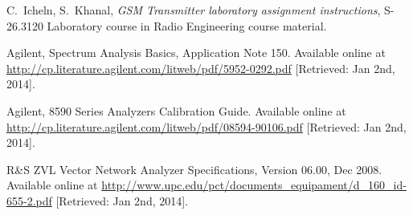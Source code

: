 \documentclass[a4paper, 12pt]{article}
\begin{document}
\newpage
\begin{thebibliography}{9}%

 C.\ Icheln, S.\ Khanal, 
	\textit{GSM Transmitter laboratory assignment instructions},
	S-26.3120 Laboratory course in Radio Engineering course material.

 Agilent, Spectrum Analysis Basics, Application Note 150. 
	Available online at \url{http://cp.literature.agilent.com/litweb/pdf/5952-0292.pdf} 
	[Retrieved: Jan 2nd, 2014].
	
 Agilent, 8590 Series Analyzers Calibration Guide.
	Available online at \url{http://cp.literature.agilent.com/litweb/pdf/08594-90106.pdf}
	[Retrieved: Jan 2nd, 2014].
	
 R\&S ZVL Vector Network Analyzer Specifications, 
	Version 06.00, Dec 2008. 
	Available online at \url{http://www.upc.edu/pct/documents_equipament/d_160_id-655-2.pdf} 
	[Retrieved: Jan 2nd, 2014].


	

	

\end{thebibliography}
\end{document}
